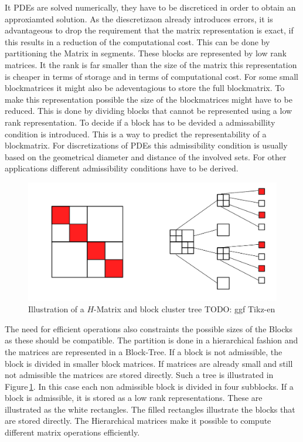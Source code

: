 \documentclass[doctype=mastersthesis,BCOR=15mm,biblatex]{ldvbook}%
\begin{document}
It PDEs are solved numerically, they have to be discreticed in order to obtain an approxiamted solution.
As the diescretizaon already introduces errors, it is advantageous to drop the requirement that the matrix representation is exact, if this results in a reduction of the computational cost.
This can be done by partitioning the Matrix in segments. These blocks are represented by low rank matrices. It the rank is far smaller than the size of the matrix this representation is cheaper in terms of storage and in terms of computational cost.
For some small blockmatrices it might also be adeventagious to store the full blockmatrix.
To make this representation possible the size of the blockmatrices might have to be reduced.
This is done by dividing blocks that cannot be represented using a low rank representation.
To decide if a block has to be devided a admissabillity condition is introduced.
This is a way to predict the representability of a blockmatrix.
For discretizations of PDEs this admissibility condition is usually based on the geometrical diameter and distance of the involved sets.
For other applications different admissibility conditions have to be derived.


\begin{figure}
	\centering
	\includegraphics[width=0.7\linewidth]{diagrams/Struktur_H-matrix}
	\caption{Illustration of a $H$-Matrix and block cluster tree TODO: ggf Tikz-en}
	\label{fig:strukturh-matrix}
\end{figure}


The need for efficient operations also constraints the possible sizes of the Blocks as these should be compatible.
The partition is done in a hierarchical fashion and the matrices are represented in a Block-Tree. 
If a block is not admissible, the block is divided in smaller block matrices.
If matrices are already small and still not admissible the matrices are stored directly.
Such a tree is illustrated in Figure\,\ref*{fig:strukturh-matrix}.
In this case each non admissible block is divided in four subblocks. 
If a block is admissible, it is stored as a low rank representations.
These are illustrated as the white rectangles.
The filled rectangles illustrate the blocks that are stored directly.
The Hierarchical matrices make it possible to compute different matrix operations efficiently.
\end{document}
